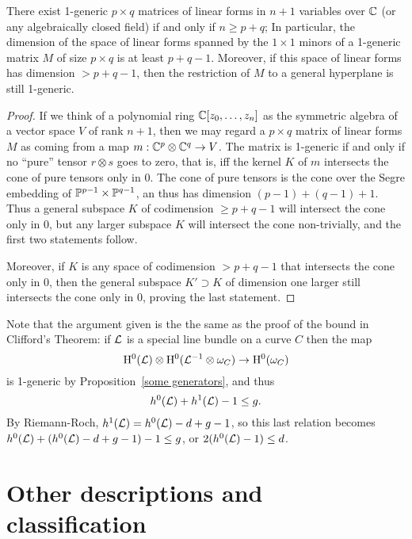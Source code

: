 \begin{lemma} \label{size of 1-generic}
There exist 1-generic $p\times q$ matrices of linear forms in $n+1$ variables over $\CC$ (or any algebraically closed field) if and only if $n\geq p+q$;
In particular, the dimension of the space of linear forms spanned by the $1\times 1$ minors of a  1-generic matrix $M$ of size $p\times q$ is at least $p+q-1$. Moreover, if this space of linear forms has dimension $>p+q-1$, then the restriction of $M$ to a general hyperplane is still 1-generic.
\end{lemma}

\begin{proof}
If we think of a polynomial ring $\CC[z_0,\dots,z_n]$ as the symmetric algebra
of a vector space $V$ of rank $n+1$, then we may regard a $p\times q$ matrix of
linear forms $M$ as coming from a map $m: \CC^{p}\otimes \CC^{q}\to V$. The matrix is 1-generic
if and only if no ``pure'' tensor $r\otimes s$ goes to zero, that is, iff the kernel $K$ of $m$ intersects the cone of
pure tensors only in 0. The cone of pure tensors is the cone over the Segre embedding of $\PP^{p-1}\times \PP^{q-1}$, 
an thus has dimension $(p-1)+(q-1)+1$. Thus a general subspace $K$ of codimension $\geq p+q-1$ will intersect the cone
only in 0, but any larger subspace $K$ will intersect the cone non-trivially,  and the first two statements follow.

Moreover, if $K$ is any space of codimension $>p+q-1$ that intersects the cone only in 0, then the general subspace $K'\supset K$
of dimension one larger still intersects the cone only in 0, proving the last statement.
\end{proof}

Note that the argument given is the the same as the proof of the bound in Clifford's Theorem: if $\cL$ is a special
line bundle on a curve $C$ then the map 
$$
\HH^0(\cL) \otimes \HH^0(\cL^{-1}\otimes \omega_C) \to \HH^0 (\omega_C)
$$
is 1-generic by Proposition~\ref{some generators}, and thus
$$
h^0(\cL)+h^1(\cL)-1 \leq g.
$$
By Riemann-Roch,  $h^1(\cL) = h^0(\cL) -d+g-1$, so this last relation becomes
$h^0(\cL)+(h^0(\cL) -d+g-1) -1 \leq g$, or $2(h^0(\cL)-1) \leq d$.


\section{Other descriptions and classification}

